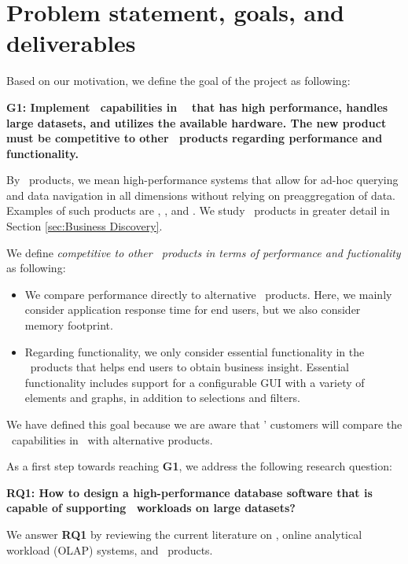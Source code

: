 \section{Problem statement, goals, and deliverables}
\label{sec:problem-statement-and-goals}
Based on our motivation, we define the goal of the project as following: 

\textbf{G1: Implement \bd~capabilities in \genusSoftware~ that has high performance, handles large datasets, and utilizes the available hardware. The new product must be competitive to other \bd~products regarding performance and functionality.}

By \bd~products, we mean high-performance systems that allow for ad-hoc querying and data navigation in all dimensions without relying on preaggregation of data. Examples of such products are \qlikview, \tableau, and \powerpivot. We study \bd~products in greater detail in Section \ref{sec:Business Discovery}.

We define \textit{competitive to other \bd~products in terms of performance and fuctionality} as following:
\begin{itemize}
  \item We compare performance directly to alternative \bd~products. Here, we mainly consider application response time for end users, but we also consider memory footprint.
  \item Regarding functionality, we only consider essential functionality in the \bd~products that helps end users to obtain business insight. Essential functionality includes support for a configurable GUI with a variety of elements and graphs, in addition to selections and filters.
\end{itemize}

We have defined this goal because we are aware that \genus' customers will compare the \bd~capabilities in \genusSoftware~with alternative products. 

As a first step towards reaching \textbf{G1}, we address the following research question:

\textbf{RQ1: How to design a high-performance database software that is capable of supporting \bd~workloads on large datasets?} 

We answer \textbf{RQ1} by reviewing the current literature on \bi, online analytical workload (OLAP) systems, and \bd~products.
